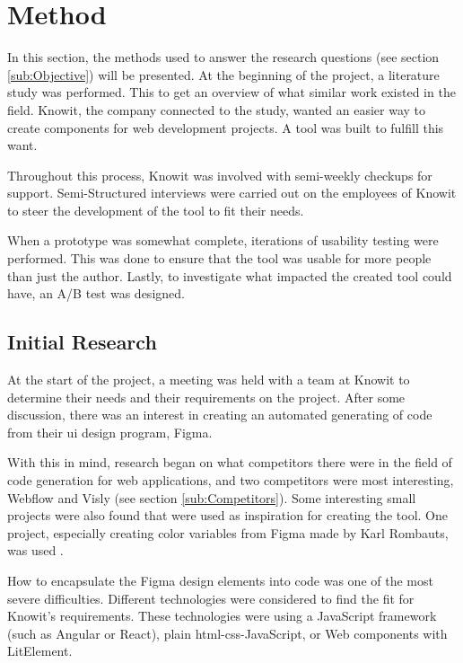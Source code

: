 \section{Method}

In this section, the methods used to answer the research questions (see section \ref{sub:Objective}) will be presented. At the beginning of the project, a literature study was performed. This to get an overview of what similar work existed in the field. Knowit, the company connected to the study, wanted an easier way to create components for web development projects. A tool was built to fulfill this want. 

Throughout this process, Knowit was involved with semi-weekly checkups for support. Semi-Structured interviews were carried out on the employees of Knowit to steer the development of the tool to fit their needs. 

When a prototype was somewhat complete, iterations of usability testing were performed. This was done to ensure that the tool was usable for more people than just the author. Lastly, to investigate what impacted the created tool could have, an A/B test was designed.

\subsection{Initial Research}%
\label{sub:Initial Research}

At the start of the project, a meeting was held with a team at Knowit to determine their needs and their requirements on the project. After some discussion, there was an interest in creating an automated generating of code from their \acrshort{ui} design program, Figma. 

With this in mind, research began on what competitors there were in the field of code generation for web applications, and two competitors were most interesting, Webflow and Visly (see section \ref{sub:Competitors}). Some interesting small projects were also found that were used as inspiration for creating the tool. One project, especially creating color variables from Figma made by Karl Rombauts, was used \cite{rombautsKarlRombautsFigmaSCSSGenerator2021}.

How to encapsulate the Figma design elements into code was one of the most severe difficulties.  Different technologies were considered to find the fit for Knowit's requirements.  These technologies were using a JavaScript framework (such as Angular or React), plain \acrshort{html}-\acrshort{css}-JavaScript, or Web \glspl{component} with LitElement. 

